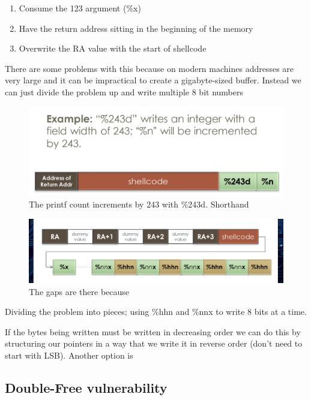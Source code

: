 \documentclass[../notes.tex]{subfiles}
\begin{document}
\begin{enumerate}
    \item Consume the 123 argument (\%x)
    \item Have the return address sitting in the beginning of the memory
    \item Overwrite the RA value with the start of shellcode
\end{enumerate}

There are some problems with this because on modern machines addresses are very large and it can be impractical to create a gigabyte-sized buffer.
Instead we can just divide the problem up and write multiple 8 bit numbers

\begin{figure}[H]
    \centering
    \includegraphics[width=0.8\linewidth]{img/image_2023-01-16-19-46-14.png}
    \caption{The printf count increments by 243 with \%243d. Shorthand}
\end{figure}


\begin{figure}[H]
    \centering
    \includegraphics[width=0.8\linewidth]{img/image_2023-01-16-19-48-17.png}
    \caption{The gaps are there because }
\end{figure}
Dividing the problem into pieces; using \%hhn and \%nnx to write 8 bits at a time. 

If the bytes being written must be written in decreasing order we can do this by structuring our pointers in a way that we write it in reverse order (don't need to start with LSB). Another option is 



\subsection{Double-Free vulnerability}
\end{document}
